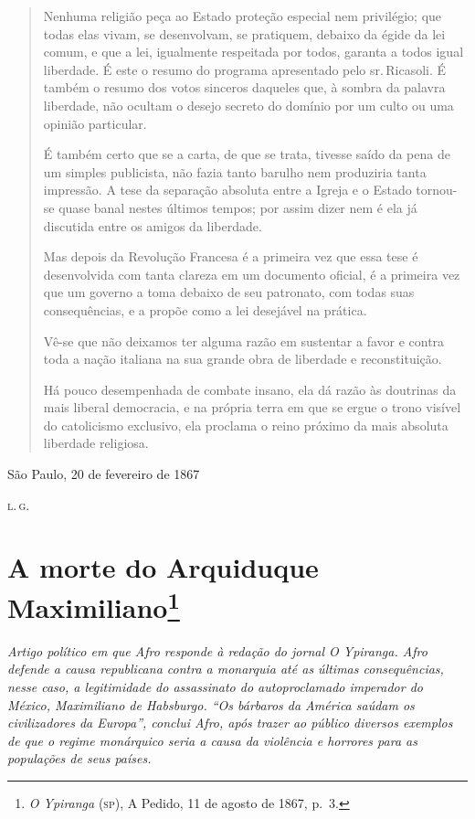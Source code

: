 \begin{quote}
Nenhuma religião peça ao Estado proteção especial nem privilégio; que
todas elas vivam, se desenvolvam, se pratiquem, debaixo da égide da lei
comum, e que a lei, igualmente respeitada por todos, garanta a todos
igual liberdade. É este o resumo do programa apresentado pelo sr.\,Ricasoli. É também o resumo dos votos sinceros daqueles que, à sombra da
palavra liberdade, não ocultam o desejo secreto do domínio por um culto
ou uma opinião particular.

É também certo que se a carta, de que se trata, tivesse saído da pena de
um simples publicista, não fazia tanto barulho nem produziria tanta
impressão. A tese da separação absoluta entre a Igreja e o Estado
tornou-se quase banal nestes últimos tempos; por assim dizer nem é ela
já discutida entre os amigos da liberdade.

Mas depois da Revolução Francesa é a primeira vez que essa tese é
desenvolvida com tanta clareza em um documento oficial, é a primeira vez
que um governo a toma debaixo de seu patronato, com todas suas
consequências, e a propõe como a lei desejável na prática.

Vê-se que não deixamos ter alguma razão em sustentar a favor e contra
toda a nação italiana na sua grande obra de liberdade e reconstituição.

Há pouco desempenhada de combate insano, ela dá razão às doutrinas da
mais liberal democracia, e na própria terra em que se ergue o trono
visível do catolicismo exclusivo, ela proclama o reino próximo da mais
absoluta liberdade religiosa.
\end{quote}

\begin{flushright}
São Paulo, 20 de fevereiro de 1867

\textsc{l.\,g.}
\end{flushright}

\chapter{A morte do Arquiduque Maximiliano\footnote{\emph{O Ypiranga} (\textsc{sp}), A Pedido, 11 de agosto de 1867, p.~3.}}

\begin{didascalia}\itshape
Artigo político em que Afro responde à redação do jornal \textnormal{O
Ypiranga}. Afro defende a causa republicana contra a
monarquia até as últimas consequências, nesse caso, a legitimidade do
assassinato do autoproclamado imperador do México, Maximiliano de
Habsburgo. ``Os bárbaros da América saúdam os civilizadores da Europa'',
conclui Afro, após trazer ao público diversos exemplos de que o regime
monárquico seria a causa da violência e horrores para as populações de
seus países.
\end{didascalia}



